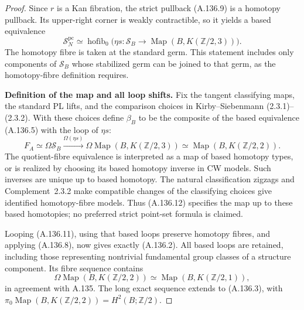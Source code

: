 \begin{proof}
Since $r$ is a Kan fibration, the strict pullback (A.136.9) is a
homotopy pullback. Its upper-right corner is weakly contractible,
so it yields a based equivalence
\[
 \mathcal S_N^{\mathrm{pc}}
 \simeq\operatorname{hofib}_0
 \bigl(\eta s:\mathcal S_B\longrightarrow
 \operatorname{Map}(B,K(\mathbb Z/2,3))\bigr).            \tag{A.136.11}
\]
The homotopy fibre is taken at the standard germ. This statement
includes only components of $\mathcal S_B$ whose stabilized germ
can be joined to that germ, as the homotopy-fibre definition requires.

\textbf{Definition of the map and all loop shifts.}
Fix the tangent classifying maps, the standard PL lifts, and the
comparison choices in Kirby--Siebenmann (2.3.1)--(2.3.2). With these
choices define $\beta_B$ to be the composite of the based equivalence
(A.136.5) with the loop of $\eta s$:
\[
 F_A\simeq\Omega\mathcal S_B
 \xrightarrow{\Omega(\eta s)}
 \Omega\operatorname{Map}(B,K(\mathbb Z/2,3))
 \simeq\operatorname{Map}(B,K(\mathbb Z/2,2)).            \tag{A.136.12}
\]
The quotient-fibre equivalence is interpreted as a map of based
homotopy types, or is realized by choosing its based homotopy inverse
in CW models. Such inverses are unique up to based homotopy.
The natural classification zigzags and Complement~2.3.2 make
compatible changes of the classifying choices give identified
homotopy-fibre models. Thus (A.136.12) specifies the map up to these
based homotopies; no preferred strict point-set formula is claimed.

Looping (A.136.11), using that based loops preserve homotopy fibres,
and applying (A.136.8), now gives exactly (A.136.2). All based loops
are retained, including those representing nontrivial fundamental
group classes of a structure component. Its fibre sequence contains
\[
 \Omega\operatorname{Map}(B,K(\mathbb Z/2,2))
 \simeq\operatorname{Map}(B,K(\mathbb Z/2,1)),
\]
in agreement with A.135. The long exact sequence extends to
(A.136.3), with
$\pi_0\operatorname{Map}(B,K(\mathbb Z/2,2))=H^2(B;\mathbb Z/2)$.


\end{proof}
